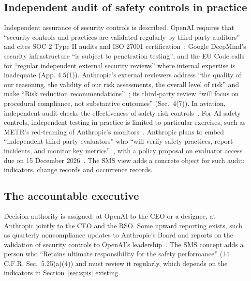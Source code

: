 \documentclass[11pt]{article}
\begin{document}
\subsection{Independent audit of safety controls in practice}\label{sec:gap-audit}

Independent assurance of security controls is described. OpenAI requires that ``security controls and practices are validated regularly by third-party auditors''~\cite[App.~C.3]{openai2025pf} and cites SOC 2 Type II audits and ISO 27001 certification~\cite[Sec.~3]{openaiFGF}; Google DeepMind's security infrastructure ``is subject to penetration testing''; and the EU Code calls for ``regular independent external security reviews'' where internal expertise is inadequate (App. 4.5(1)). Anthropic's external reviewers address ``the quality of our reasoning, the validity of our risk assessments, the overall level of risk'' and make ``Risk reduction recommendations''~\cite[Sec.~3.6]{anthropic2026rsp}; its third-party review ``will focus on procedural compliance, not substantive outcomes'' (Sec.~4(7)). In aviation, independent audit checks the effectiveness of safety risk controls~\cite[9.5.4.3]{icao2018doc9859}. For AI safety controls, independent testing in practice is limited to particular exercises, such as METR's red-teaming of Anthropic's monitors~\cite{metr2026frr}. Anthropic plans to embed ``independent third-party evaluators'' who ``will verify safety practices, report incidents, and monitor key metrics''~\cite{favaro2026}, with a policy proposal on evaluator access due on 15 December 2026~\cite{anthropic2026roadmap}. The SMS view adds a concrete object for such audit: indicators, change records and occurrence records.

\subsection{The accountable executive}\label{sec:gap-ae}

Decision authority is assigned: at OpenAI to the CEO or a designee, at Anthropic jointly to the CEO and the RSO. Some upward reporting exists, such as quarterly noncompliance updates to Anthropic's Board and reports on the validation of security controls to OpenAI's leadership~\cite[App.~C.3]{openai2025pf}. The SMS concept adds a person who ``Retains ultimate responsibility for the safety performance'' (14 C.F.R. Sec.~5.25(a)(4)) and must review it regularly, which depends on the indicators in Section~\ref{sec:spis} existing.
\end{document}

